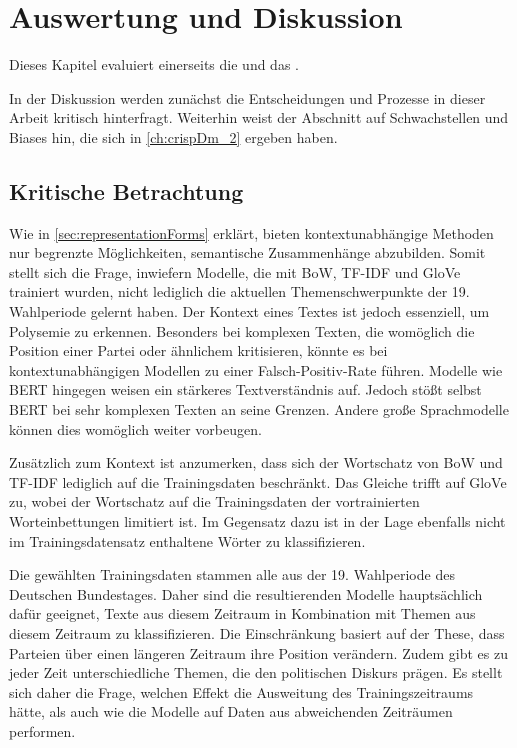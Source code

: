 \chapter{Auswertung und Diskussion} \label{ch:crispDm_3}

Dieses Kapitel evaluiert einerseits die  und das .

In der Diskussion werden zunächst die Entscheidungen und Prozesse in dieser Arbeit kritisch hinterfragt. Weiterhin weist der Abschnitt auf Schwachstellen und Biases hin, die sich in \autoref{ch:crispDm_2} ergeben haben.

\section{Kritische Betrachtung} \label{subsec:discussion}

Wie in \autoref{sec:representationForms} erklärt, bieten kontextunabhängige Methoden nur begrenzte Möglichkeiten, semantische Zusammenhänge abzubilden. Somit stellt sich die Frage, inwiefern Modelle, die mit \ac{BoW}, \ac{TF-IDF} und \ac{GloVe} trainiert wurden, nicht lediglich die aktuellen Themenschwerpunkte der 19. Wahlperiode gelernt haben. Der Kontext eines Textes ist jedoch essenziell, um Polysemie zu erkennen. Besonders bei komplexen Texten, die womöglich die Position einer Partei oder ähnlichem kritisieren, könnte es bei kontextunabhängigen Modellen zu einer Falsch-Positiv-Rate führen. Modelle wie \ac{BERT} hingegen weisen ein stärkeres Textverständnis auf. Jedoch stößt selbst \ac{BERT} bei sehr komplexen Texten an seine Grenzen. Andere große Sprachmodelle können dies womöglich weiter vorbeugen.

Zusätzlich zum Kontext ist anzumerken, dass sich der Wortschatz von \ac{BoW} und \ac{TF-IDF} lediglich auf die Trainingsdaten beschränkt. Das Gleiche trifft auf \ac{GloVe} zu, wobei der Wortschatz auf die Trainingsdaten der vortrainierten Worteinbettungen limitiert ist. Im Gegensatz dazu ist \ft in der Lage ebenfalls nicht im Trainingsdatensatz enthaltene Wörter zu klassifizieren.

Die gewählten Trainingsdaten stammen alle aus der \num{19}. Wahlperiode des Deutschen Bundestages. Daher sind die resultierenden Modelle hauptsächlich dafür geeignet, Texte aus diesem Zeitraum in Kombination mit Themen aus diesem Zeitraum zu klassifizieren. Die Einschränkung basiert auf der These, dass Parteien über einen längeren Zeitraum ihre Position verändern. Zudem gibt es zu jeder Zeit unterschiedliche Themen, die den politischen Diskurs prägen. Es stellt sich daher die Frage, welchen Effekt die Ausweitung des Trainingszeitraums hätte, als auch wie die Modelle auf Daten aus abweichenden Zeiträumen performen.

